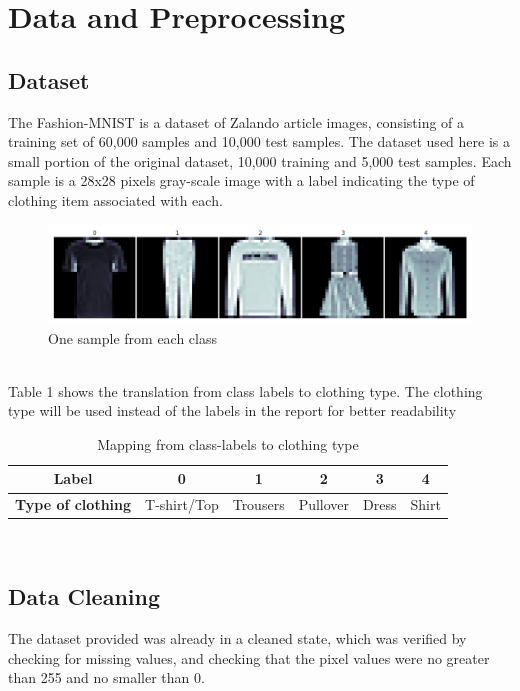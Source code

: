 \section{Data and Preprocessing}
\subsection{Dataset}
The Fashion-MNIST is a dataset of Zalando article images, consisting of a training set of 60,000 samples and 10,000 test samples.
The dataset used here is a small portion of the original dataset, 10,000 training and 5,000 test samples.
Each sample is a 28x28 pixels gray-scale image with a label indicating the type of clothing item associated with each.
\newline

\begin{figure}[ht]
\centering
\includegraphics[scale=0.45]{figures_for_report/samples_from_classes}
\captionsetup{justification=centering,margin=2cm}
\caption{One sample from each class}
\end{figure}\\

Table 1 shows the translation from class labels to clothing type.
The clothing type will be used instead of the labels in the report for better readability \\
\begin{table}[!ht]
  \footnotesize
  \centering
\begin{tabular}{ c c c c c c }
 \toprule
 \textbf{Label} & 0 & 1 & 2 & 3 & 4 \\
 \midrule 
 \textbf{Type of clothing} & T-shirt/Top & Trousers & Pullover & Dress & Shirt \\
 \bottomrule
\end{tabular} \\[0.2cm]
\captionsetup{justification=centering,margin=2cm}
\caption{Mapping from class-labels to clothing type}
\label{tab:features}
\end{table}


\subsection{Data Cleaning}\label{subsec:data-cleaning}
The dataset provided was already in a cleaned state, which was verified by checking for missing values,
and checking that the pixel values were no greater than 255 and no smaller than 0.

